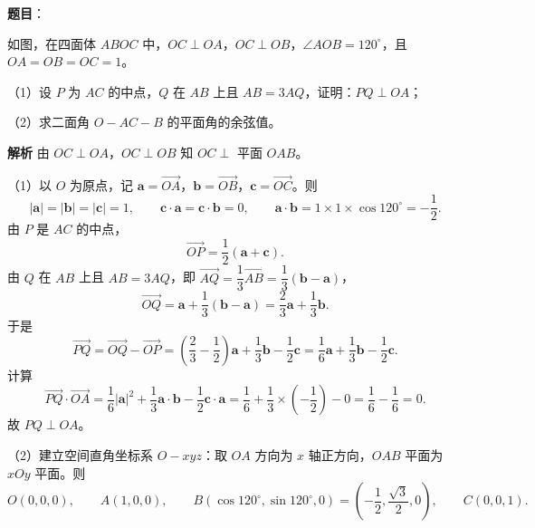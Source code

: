 \begin{answer}

\textbf{题目}：

如图，在四面体 $ABOC$ 中，$OC\perp OA$，$OC\perp OB$，$\angle AOB=120^\circ$，且 $OA=OB=OC=1$。

（1）设 $P$ 为 $AC$ 的中点，$Q$ 在 $AB$ 上且 $AB=3AQ$，证明：$PQ\perp OA$；

（2）求二面角 $O-AC-B$ 的平面角的余弦值。
\nopagebreak[4]
\begin{center}\end{center}
\nopagebreak[4]
\textbf{解析}
由 $OC\perp OA$，$OC\perp OB$ 知 $OC\perp$ 平面 $OAB$。

（1）以 $O$ 为原点，记 $\boldsymbol a=\overrightarrow{OA}$，$\boldsymbol b=\overrightarrow{OB}$，$\boldsymbol c=\overrightarrow{OC}$。则
\nopagebreak[4]
\[|\boldsymbol a|=|\boldsymbol b|=|\boldsymbol c|=1,\qquad \boldsymbol c\cdot\boldsymbol a=\boldsymbol c\cdot\boldsymbol b=0,\qquad \boldsymbol a\cdot\boldsymbol b=1\times1\times\cos120^\circ=-\frac12.\]
由 $P$ 是 $AC$ 的中点，
\nopagebreak[4]
\[\overrightarrow{OP}=\frac12\left(\boldsymbol a+\boldsymbol c\right).\]
由 $Q$ 在 $AB$ 上且 $AB=3AQ$，即 $\overrightarrow{AQ}=\dfrac13\overrightarrow{AB}=\dfrac13(\boldsymbol b-\boldsymbol a)$，
\nopagebreak[4]
\[\overrightarrow{OQ}=\boldsymbol a+\frac13(\boldsymbol b-\boldsymbol a)=\frac23\boldsymbol a+\frac13\boldsymbol b.\]
于是
\nopagebreak[4]
\[\overrightarrow{PQ}=\overrightarrow{OQ}-\overrightarrow{OP}=\left(\frac23-\frac12\right)\boldsymbol a+\frac13\boldsymbol b-\frac12\boldsymbol c=\frac16\boldsymbol a+\frac13\boldsymbol b-\frac12\boldsymbol c.\]
计算
\nopagebreak[4]
\[\overrightarrow{PQ}\cdot\overrightarrow{OA}=\frac16|\boldsymbol a|^2+\frac13\boldsymbol a\cdot\boldsymbol b-\frac12\boldsymbol c\cdot\boldsymbol a
=\frac16+\frac13\times\left(-\frac12\right)-0=\frac16-\frac16=0.\]
故 $PQ\perp OA$。

（2）建立空间直角坐标系 $O-xyz$：取 $OA$ 方向为 $x$ 轴正方向，$OAB$ 平面为 $xOy$ 平面。则
\nopagebreak[4]
\[O(0,0,0),\qquad A(1,0,0),\qquad B\left(\cos120^\circ,\sin120^\circ,0\right)=\left(-\frac12,\frac{\sqrt3}{2},0\right),\qquad C(0,0,1).\]


\end{answer}
